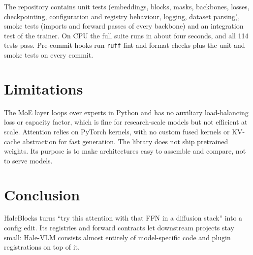 \documentclass[11pt]{article}
\begin{document}
The repository contains unit tests (embeddings, blocks, masks, backbones, losses,
checkpointing, configuration and registry behaviour, logging, dataset parsing), smoke
tests (imports and forward passes of every backbone) and an integration test of the
trainer. On CPU the full suite runs in about four seconds, and all 114 tests pass. Pre-commit
hooks run \texttt{ruff} lint and format checks plus the unit and smoke tests on every commit.

\section{Limitations}

The MoE layer loops over experts in Python and has no auxiliary load-balancing loss or
capacity factor, which is fine for research-scale models but not efficient at scale.
Attention relies on PyTorch kernels, with no custom fused kernels or KV-cache abstraction
for fast generation. The library does not ship pretrained weights. Its purpose is to make
architectures easy to assemble and compare, not to serve models.

\section{Conclusion}

HaleBlocks turns ``try this attention with that FFN in a diffusion stack'' into a config
edit. Its registries and forward contracts let downstream projects stay small: Hale-VLM consists
almost entirely of model-specific code and plugin registrations on top of it.



\end{document}
